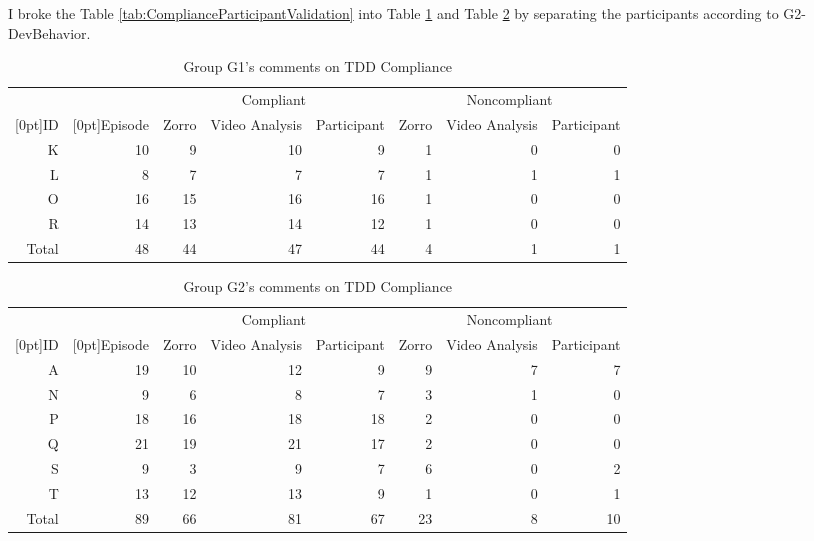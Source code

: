 I broke the Table \ref{tab:ComplianceParticipantValidation} into Table
\ref{tab:ComplianceParticipantValidationG1} and Table
\ref{tab:ComplianceParticipantValidationG2} by separating the participants
according to G2-DevBehavior.
\begin{table}[!ht] 
  \centering
\begin{tabular}{|r|r|rrr|rrr|} \hline
  &  &  \multicolumn{3}{c|}{Compliant} & \multicolumn{3}{c|}{Noncompliant} \\\cline{3-8}
  \raisebox{1.5ex}[0pt]{ID} & \raisebox{1.5ex}[0pt]{Episode} & 
   Zorro & Video Analysis  & Participant &  Zorro & Video Analysis  & Participant \\ \hline
  K & 10 &  9 & 10 &  9 &  1 & 0 & 0 \\ \hline
  L &  8 &  7 &  7 &  7 &  1 & 1 & 1 \\ \hline
  O & 16 & 15 & 16 & 16 &  1 & 0 & 0 \\ \hline
  R & 14 & 13 & 14 & 12 &  1 & 0 & 0 \\ \hline
  Total & 48 &  44 & 47 & 44 & 4 & 1 & 1 \\ \hline
  \end{tabular}  
  \caption{Group G1's comments on TDD Compliance}
  \label{tab:ComplianceParticipantValidationG1} 
\end{table}
\begin{table}[!ht] 
  \centering
\begin{tabular}{|r|r|rrr|rrr|} \hline
  &  &  \multicolumn{3}{c|}{Compliant} & \multicolumn{3}{c|}{Noncompliant} \\\cline{3-8}
  \raisebox{1.5ex}[0pt]{ID} & \raisebox{1.5ex}[0pt]{Episode} & 
   Zorro & Video Analysis  & Participant &  Zorro & Video Analysis  & Participant \\ \hline
 A & 19 &  10 & 12 &  9 & 9 & 7 & 7 \\ \hline
 N &  9 &   6 &  8 &  7 & 3 & 1 & 0 \\ \hline
 P &  18 & 16 & 18 & 18 & 2 & 0 & 0 \\ \hline
 Q &  21 & 19 & 21 & 17 & 2 & 0 & 0 \\ \hline
 S &   9 &  3 &  9 &  7 & 6 & 0 & 2 \\ \hline
 T &  13 & 12 & 13 & 9 &  1 & 0 & 1 \\ \hline
 Total & 89 & 66 & 81 & 67 & 23 & 8 & 10 \\ \hline
  \end{tabular}  
  \caption{Group G2's comments on TDD Compliance}
  \label{tab:ComplianceParticipantValidationG2} 
\end{table}

